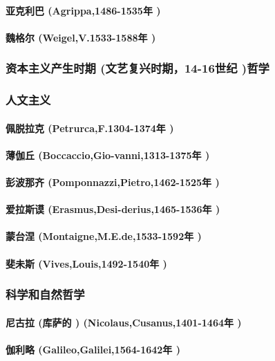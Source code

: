 \documentclass[UTF8]{../RepresentationUniverse}
\begin{document}
    \paragraph{亚克利巴 (Agrippa,1486-1535年 )}
    \paragraph{魏格尔 (Weigel,V.1533-1588年 )}
\subsubsection{资本主义产生时期 (文艺复兴时期，14-16世纪 )哲学}
\subsubsection{人文主义}
    \paragraph{佩脱拉克 (Petrurca,F.1304-1374年 )}
    \paragraph{薄伽丘 (Boccaccio,Gio-vanni,1313-1375年 )}
    \paragraph{彭波那齐 (Pomponnazzi,Pietro,1462-1525年 )}
    \paragraph{爱拉斯谟 (Erasmus,Desi-derius,1465-1536年 )}
    \paragraph{蒙台涅 (Montaigne,M.E.de,1533-1592年 )}
    \paragraph{斐未斯 (Vives,Louis,1492-1540年 )}
\subsubsection{科学和自然哲学}
    \paragraph{尼古拉 (库萨的 ) (Nicolaus,Cusanus,1401-1464年 )}
    \paragraph{伽利略 (Galileo,Galilei,1564-1642年 )}
\end{document}
